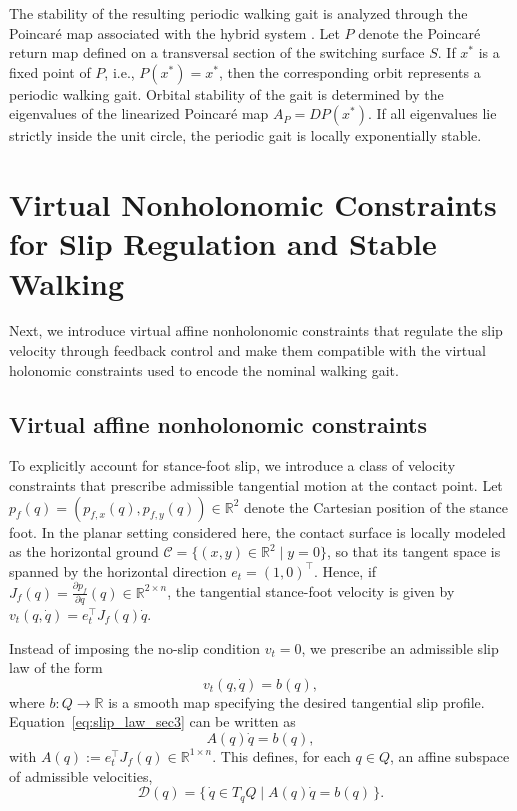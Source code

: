 \documentclass[letterpaper, 10 pt, conference]{ieeeconf}
\begin{document}
The stability of the resulting periodic walking gait is analyzed
through the Poincaré map associated with the hybrid system \cite{morris2005restricted, goodman2019existence}.
Let $P$ denote the Poincaré return map defined on a transversal
section of the switching surface $S$.
If $x^\ast$ is a fixed point of $P$, i.e., $P(x^\ast) = x^\ast$, then the corresponding orbit represents a periodic walking gait. Orbital stability of the gait is determined by the eigenvalues of the
linearized Poincaré map $A_P=DP(x^\ast)$. If all eigenvalues lie strictly inside the unit circle, the periodic
gait is locally exponentially stable.

\section{Virtual Nonholonomic Constraints for Slip Regulation and Stable Walking}

Next, we introduce virtual affine nonholonomic constraints that regulate the slip velocity through feedback control and make them compatible with the virtual holonomic constraints used to encode the nominal walking gait.

\subsection{Virtual affine nonholonomic constraints}

To explicitly account for stance-foot slip, we introduce a class of velocity constraints that prescribe admissible tangential motion at the contact point. Let $p_f(q)=(p_{f,x}(q),p_{f,y}(q))\in\mathbb R^2$ denote the Cartesian position of the stance foot. In the planar setting considered here, the contact surface is locally modeled as the horizontal ground $\mathcal C=\{(x,y)\in\mathbb R^2 \mid y=0\}$, so that its tangent space is spanned by the horizontal direction $e_t=(1,0)^\top$. Hence, if $J_f(q)=\frac{\partial p_f}{\partial q}(q)\in\mathbb R^{2\times n}$, the tangential stance-foot velocity is given by $v_t(q,\dot q)=e_t^\top J_f(q)\dot q$.


Instead of imposing the no-slip condition $v_t=0$, we prescribe an admissible slip law of the form
\begin{equation}
v_t(q,\dot q)=b(q),
\label{eq:slip_law_sec3}
\end{equation}
where $b:Q\to\mathbb{R}$ is a smooth map specifying the desired tangential slip profile. Equation~\eqref{eq:slip_law_sec3} can be written as
\begin{equation}
A(q)\dot q=b(q),
\label{eq:affine_constraint_sec3}
\end{equation}
with $A(q):=e_t^\top J_f(q)\in\mathbb R^{1\times n}$. This defines, for each $q\in Q$, an affine subspace of admissible velocities,
\begin{equation}
\mathcal D(q)=\{\,\dot q\in T_qQ \mid A(q)\dot q=b(q)\,\}.
\label{eq:affine_distribution_sec3}
\end{equation}
\end{document}
